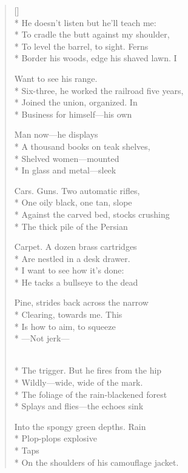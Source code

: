 \label{ch:target_practice}
\settowidth{\versewidth}{Border his woods, edge his shaved lawn.       I}
\begin{verse}[\versewidth]
\\*
He doesn't listen but he'll teach me:\\*
To cradle the butt against my shoulder, \\*
To level the barrel, to sight.     Ferns\\*
Border his woods, edge his shaved lawn.       I

Want to see his range.\\*
Six-three, he worked the railroad five years,\\*
Joined the union, organized.     In\\*
Business for himself---his own

Man now---he displays\\*
A thousand books on teak shelves,\\*
Shelved women---mounted\\*
In glass and metal---sleek

Cars. Guns.   Two automatic rifles,\\*
One oily black, one tan, slope\\*
Against the carved bed, stocks crushing\\*
The thick pile of the Persian

Carpet.    A dozen brass cartridges\\*
Are nestled in a desk drawer.\\*
I want to see how it's done:\\*
He tacks a bullseye to the dead

Pine, strides back across the narrow\\*
Clearing, towards me.      This\\*
Is how to aim, to squeeze\\*
---Not jerk---

\\*
The trigger.    But he fires from the hip\\*
Wildly---wide, wide of the mark.\\*
The foliage of the rain-blackened forest\\*
Splays and flies---the echoes sink

Into the spongy green depths.   Rain\\*
Plop-plops explosive\\*
Taps\\*
On the shoulders of his camouflage jacket.
\end{verse}
